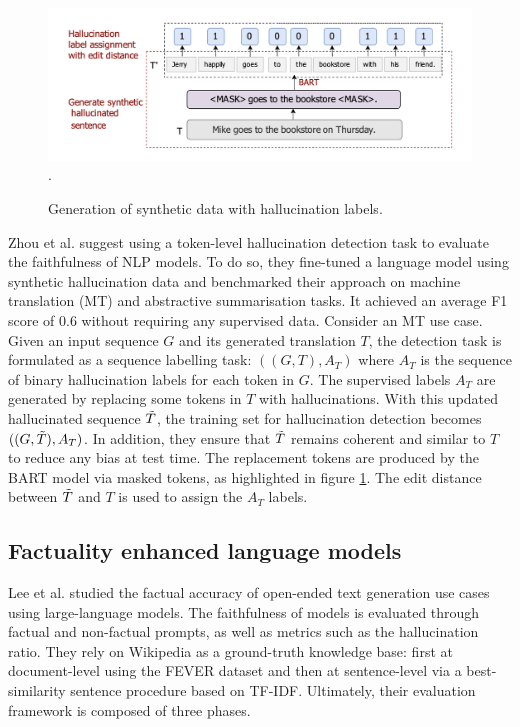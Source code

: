 \begin{figure}[!ht]
    \centering
    \includegraphics[scale=0.6]{figures/related_work/synthetic_hallu.png}.
    \caption{Generation of synthetic data with hallucination labels\cite{HallucationDetectionUsingSyntheticData}.}
    \label{fig:BART-synthetic-hallucination-creation}
\end{figure}

Zhou et al.\cite{HallucationDetectionUsingSyntheticData} suggest using a token-level hallucination detection task to evaluate the faithfulness of NLP models. To do so, they fine-tuned a language model using synthetic hallucination data and benchmarked their approach on machine translation (MT) and abstractive summarisation tasks. It achieved an average F1 score of 0.6 without requiring any supervised data. Consider an MT use case. Given an input sequence $G$ and its generated translation $T$, the detection task is formulated as a sequence labelling task: $((G, T), A_T)$ where $A_T$ is the sequence of binary hallucination labels for each token in $G$. The supervised labels $A_T$ are generated by replacing some tokens in $T$ with hallucinations. With this updated hallucinated sequence $\Tilde{T}$, the training set for hallucination detection becomes $((G, \Tilde{T}), A_T)$. In addition, they ensure that $\Tilde{T}$ remains coherent and similar to $T$ to reduce any bias at test time. The replacement tokens are produced by the BART model via masked tokens, as highlighted in figure \ref{fig:BART-synthetic-hallucination-creation}. The edit distance between $\Tilde{T}$ and $T$ is used to assign the $A_T$ labels.

\subsection{Factuality enhanced language models} \label{related-work:factuality-enhanced-LM}


Lee et al.\cite{factualityEnhancedLM} studied the factual accuracy of open-ended text generation use cases using large-language models. The faithfulness of models is evaluated through factual and non-factual prompts, as well as metrics such as the hallucination ratio. They rely on Wikipedia as a ground-truth knowledge base: first at document-level using the FEVER dataset and then at sentence-level via a best-similarity sentence procedure based on TF-IDF. Ultimately, their evaluation framework is composed of three phases.

